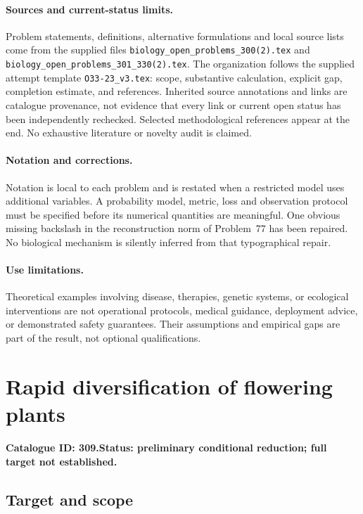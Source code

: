 \documentclass[11pt]{article}
\begin{document}
\paragraph{Sources and current-status limits.}
Problem statements, definitions, alternative formulations and local source lists
come from the supplied files
\texttt{biology\_open\_problems\_300(2).tex} and
\texttt{biology\_open\_problems\_301\_330(2).tex}.
The organization follows the supplied attempt template
\texttt{O33-23\_v3.tex}: scope, substantive calculation, explicit gap,
completion estimate, and references. Inherited source annotations and links are
catalogue provenance, not evidence that every link or current open status has
been independently rechecked. Selected methodological references appear at the
end. No exhaustive literature or novelty audit is claimed.

\paragraph{Notation and corrections.}
Notation is local to each problem and is restated when a restricted model uses
additional variables. A probability model, metric, loss and observation protocol
must be specified before its numerical quantities are meaningful. One obvious
missing backslash in the reconstruction norm of Problem~77 has been repaired.
No biological mechanism is silently inferred from that typographical repair.

\paragraph{Use limitations.}
Theoretical examples involving disease, therapies, genetic systems, or ecological
interventions are not operational protocols, medical guidance, deployment advice,
or demonstrated safety guarantees. Their assumptions and empirical gaps are part
of the result, not optional qualifications.

\setcounter{section}{308}
\section{Rapid diversification of flowering plants}
\label{prob:309}
\noindent\textbf{Catalogue ID: 309.}\quad \textbf{Status: preliminary conditional reduction; full target not established.}
\subsection{Target and scope}
\end{document}
